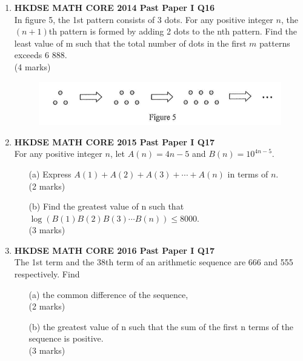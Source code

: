 \documentclass[12pt]{article}
\begin{document}
\begin{enumerate}
    \item \textbf{HKDSE MATH CORE 2014 Past Paper I Q16}\\
	In figure 5, the 1st pattern consists of 3 dots. For any positive integer $n$, the $(n + 1)$th pattern is formed by adding 2 dots to the nth pattern. Find the least value of m such that the total number of dots in the first $m$ patterns exceeds 6 888. \\(4 marks)
	\begin{figure}[H]
		\centering
		\includegraphics[width = .6\linewidth]{2014Figure1.5}
	\end{figure}

    \item \textbf{HKDSE MATH CORE 2015 Past Paper I Q17}\\
	For any positive integer $n$, let $A(n) = 4n - 5$ and $B(n) = 10^{4n-5}$.
	\begin{enumerate}
		\item[(a)] Express $A(1) + A(2) + A(3) + \cdots + A(n)$ in terms of $n$. \\(2 marks)
		\item[(b)] Find the greatest value of n such that $\log{(B(1)B(2)B(3)\cdots B(n))}\leq 8000$. \\(3 marks)
	\end{enumerate}

    \item \textbf{HKDSE MATH CORE 2016 Past Paper I Q17}\\
	The 1st term and the 38th term of an arithmetic sequence are 666 and 555 respectively. Find
	\begin{enumerate}
		\item[(a)] the common difference of the sequence, \\(2 marks)
		\item[(b)] the greatest value of n such that the sum of the first n terms of the sequence is positive. \\(3 marks)
	\end{enumerate}



\end{enumerate}
\end{document}
